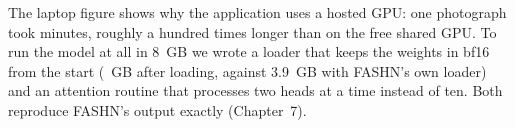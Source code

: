 The laptop figure shows why the application uses a hosted GPU: one photograph took \vGenMinutes{} minutes, roughly a hundred times longer than on the free shared GPU. To run the model at all in 8~GB we wrote a loader that keeps the weights in bf16 from the start (\vMemLoad{}~GB after loading, against 3.9~GB with FASHN's own loader) and an attention routine that processes two heads at a time instead of ten. Both reproduce FASHN's output exactly (Chapter~7).
